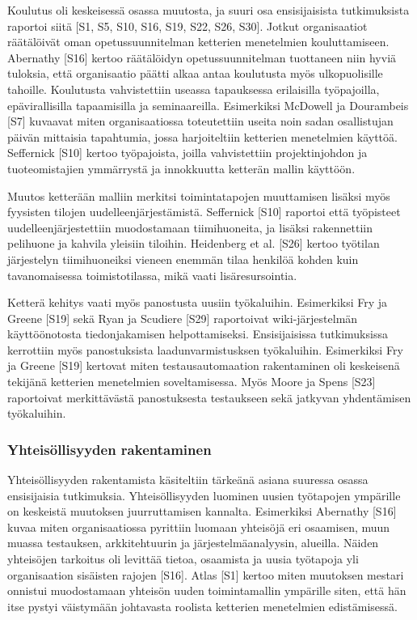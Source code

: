 Koulutus oli keskeisessä osassa muutosta, ja suuri osa ensisijaisista
tutkimuksista raportoi siitä [S1, S5, S10, S16, S19, S22, S26, S30]. Jotkut
organisaatiot räätälöivät oman opetussuunnitelman ketterien menetelmien
kouluttamiseen. Abernathy [S16] kertoo räätälöidyn opetussuunnitelman tuottaneen
niin hyviä tuloksia, että organisaatio päätti alkaa antaa koulutusta myös
ulkopuolisille tahoille. Koulutusta vahvistettiin useassa tapauksessa
erilaisilla työpajoilla, epävirallisilla tapaamisilla ja seminaareilla.
Esimerkiksi McDowell ja Dourambeis [S7] kuvaavat miten organisaatiossa
toteutettiin useita noin sadan osallistujan päivän mittaisia tapahtumia, jossa
harjoiteltiin ketterien menetelmien käyttöä. Seffernick [S10] kertoo
työpajoista, joilla vahvistettiin projektinjohdon ja tuoteomistajien ymmärrystä
ja innokkuutta ketterän mallin käyttöön.

Muutos ketterään malliin merkitsi toimintatapojen muuttamisen lisäksi myös
fyysisten tilojen uudelleenjärjestämistä. Seffernick [S10] raportoi että
työpisteet uudelleenjärjestettiin muodostamaan tiimihuoneita, ja lisäksi
rakennettiin pelihuone ja kahvila yleisiin tiloihin. Heidenberg et al. [S26]
kertoo työtilan järjestelyn tiimihuoneiksi vieneen enemmän tilaa henkilöä kohden
kuin tavanomaisessa toimistotilassa, mikä vaati lisäresursointia.

Ketterä kehitys vaati myös panostusta uusiin työkaluihin. Esimerkiksi Fry ja
Greene [S19] sekä Ryan ja Scudiere [S29] raportoivat wiki-järjestelmän
käyttöönotosta tiedonjakamisen helpottamiseksi. Ensisijaisissa tutkimuksissa
kerrottiin myös panostuksista laadunvarmistusksen työkaluihin. Esimerkiksi Fry
ja Greene [S19] kertovat miten testausautomaation rakentaminen oli keskeisenä
tekijänä ketterien menetelmien soveltamisessa. Myös Moore ja Spens [S23]
raportoivat merkittävästä panostuksesta testaukseen sekä jatkyvan yhdentämisen
työkaluihin.

\subsubsection{Yhteisöllisyyden rakentaminen}

Yhteisöllisyyden rakentamista käsiteltiin tärkeänä asiana suuressa osassa
ensisijaisia tutkimuksia. Yhteisöllisyyden luominen uusien työtapojen ympärille
on keskeistä muutoksen juurruttamisen kannalta. Esimerkiksi Abernathy [S16]
kuvaa miten organisaatiossa pyrittiin luomaan yhteisöjä eri osaamisen, muun
muassa testauksen, arkkitehtuurin ja järjestelmäanalyysin, alueilla.
Näiden yhteisöjen tarkoitus oli levittää tietoa, osaamista ja uusia työtapoja
yli organisaation sisäisten rajojen [S16]. Atlas [S1] kertoo miten muutoksen
mestari onnistui muodostamaan yhteisön uuden toimintamallin ympärille siten,
että hän itse pystyi väistymään johtavasta roolista ketterien menetelmien
edistämisessä.


